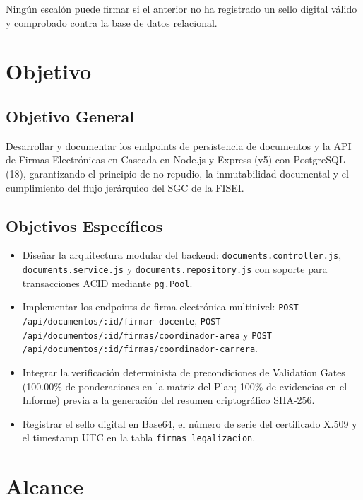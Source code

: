 \documentclass[12pt,a4paper]{article}
\begin{document}
Ningún escalón puede firmar si el anterior no ha registrado un sello digital válido y comprobado contra la base de datos relacional.

\section{Objetivo}

\subsection{Objetivo General}
Desarrollar y documentar los endpoints de persistencia de documentos y la API de Firmas Electrónicas en Cascada en Node.js y Express (v5) con PostgreSQL (18), garantizando el principio de no repudio, la inmutabilidad documental y el cumplimiento del flujo jerárquico del SGC de la FISEI.

\subsection{Objetivos Específicos}
\begin{itemize}[leftmargin=1.5em, itemsep=1.5pt, topsep=1.5pt]
    \item Diseñar la arquitectura modular del backend: \texttt{documents.controller.js}, \texttt{documents.service.js} y \texttt{documents.repository.js} con soporte para transacciones ACID mediante \texttt{pg.Pool}.
    \item Implementar los endpoints de firma electrónica multinivel: \texttt{POST /api/documentos/:id/firmar-docente}, \texttt{POST /api/documentos/:id/firmas/coordinador-area} y \texttt{POST /api/documentos/:id/firmas/coordinador-carrera}.
    \item Integrar la verificación determinista de precondiciones de Validation Gates (100.00\% de ponderaciones en la matriz del Plan; 100\% de evidencias en el Informe) previa a la generación del resumen criptográfico SHA-256.
    \item Registrar el sello digital en Base64, el número de serie del certificado X.509 y el timestamp UTC en la tabla \texttt{firmas\_legalizacion}.
\end{itemize}

\section{Alcance}
\end{document}
